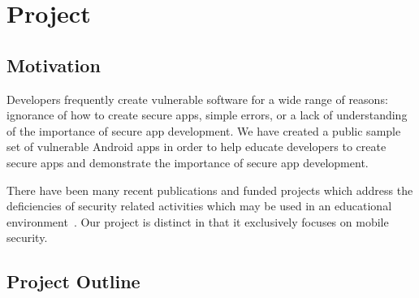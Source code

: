 \documentclass[titlepage]{article}
\begin{document}





\section{Project}

\subsection{Motivation}



Developers frequently create vulnerable software for a wide range of reasons: ignorance of how to create secure apps, simple errors, or a lack of understanding of the importance of secure app development. We have created a public sample set of vulnerable Android apps in order to help educate developers to create secure apps and demonstrate the importance of secure app development.


There have been many recent publications and funded projects which address the deficiencies of security related activities which may be used in an educational environment~\cite{Bai:2014:IHL:2538862.2538997, Guo:2013:LMS:2445196.2445394, Chi:2014:DIT:2670739.2670756, Li:2016:DHL:2978192.2978225, 10.1109/MSP.2011.139}. Our project is distinct in that it exclusively focuses on mobile security.







\subsection{Project Outline}
\end{document}
